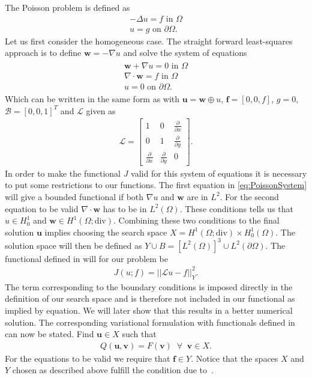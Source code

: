 The Poisson problem is defined as 
\begin{align}
	-\Delta u = f \text{ in } \Omega \\
	u = g \text{ on } \partial \Omega.
	\label{eq:Poisson}
\end{align}
Let us first consider the homogeneous case. The straight forward least-squares approach is to define $\mathbf{w} = -\nabla u$ and solve the system of equations 
\begin{align}
	\begin{split}
	\mathbf{w} + \nabla u = 0 \text{ in } \Omega \\
	\nabla \cdot \mathbf{w} = f \text{ in } \Omega \\
	u = 0 \text{ on } \partial \Omega.
	\end{split}
	\label{eq:PoissonSystem}
\end{align}
Which can be written in the same form as with $ \mathbf{u} = \mathbf{w} \oplus u $, $\mathbf{f} = [0,0,f]$, $g=0$, $\mathcal{B} = [0,0,1]^T $ and $\mathcal{L}$ given as 
\begin{align}
	\mathcal{L} =
	\begin{bmatrix}
		1 & 0 & \frac{\partial} {\partial x}  \\
		0 & 1 & \frac{\partial} {\partial y}  \\
    \frac{\partial} {\partial x} & \frac{\partial} {\partial y} & 0 
	\end{bmatrix}.
	\label{eq:Amatrix}
\end{align}
In order to make the functional $J$ valid for this system of equations it is necessary to put some restrictions to our functions. The first equation in \ref{eq:PoissonSystem} will give a bounded functional if both $\nabla u$ and $\mathbf{w}$ are in $L^2$. For the second equation to be valid $\nabla \cdot \mathbf{w}$ has to be in $L^2(\Omega)$. These conditions tells us that $u \in H_0^1$ and $\mathbf{w} \in H^1(\Omega;\text{div})$. Combining these two conditions to the final solution $\mathbf{u}$ implies choosing the search space $X =  H^1(\Omega;\text{div}) \times H_0^1(\Omega)$. The solution space will then be defined as $Y \cup  B  = [L^2(\Omega)]^3\cup L^2(\partial \Omega) $. The functional defined in will for our problem be 
\begin{align}
	J(u;f) = ||\mathcal{L}u-f||^2_Y.
	\label{eq:lsFunctionalPoisson}
\end{align}
The term corresponding to the boundary conditions is imposed directly in the definition of our search space and is therefore not included in our functional as implied by equation. We will later show that this results in a better numerical solution. The corresponding variational formulation with functionals defined in can now be stated. Find $ \mathbf{u} \in X $ such that
\begin{align}
	Q(\mathbf{u},\mathbf{v}) = F(\mathbf{v}) \;\; \forall \;\; \mathbf{v} \in X.
	\label{eq:VariationalFormulationPoisson}
\end{align}
For the equations to be valid we require that $\mathbf{f} \in Y$.
Notice that the spaces $X$ and $Y$ chosen as described above fulfill the condition due to~\cite{Bochev}. 
%
